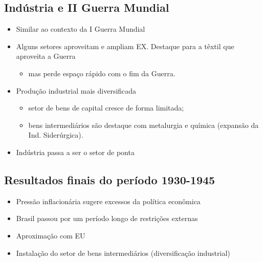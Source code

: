 \documentclass[a4paper,12pt]{article}[abntex2]
\begin{document}
\subsection{Indústria e II Guerra Mundial}
\begin{itemize}
    \item Similar ao contexto da I Guerra Mundial 
    \item Alguns setores aproveitam e ampliam EX. Destaque para a têxtil que aproveita a Guerra
    \begin{itemize}
        \item mas perde espaço rápido com o fim da Guerra. 
    \end{itemize}
    \item Produção industrial mais diversificada
    \begin{itemize}
        \item setor de bens de capital cresce de forma limitada;
        \item bens intermediários são destaque com metalurgia e química (expansão da Ind. Siderúrgica).
    \end{itemize}
    \item  Indústria passa a ser o setor de ponta

 
\end{itemize}

\subsection{Resultados finais do período 1930-1945}
\begin{itemize}
    \item Pressão inflacionária sugere excessos da política econômica
    \item Brasil passou por um período longo de restrições externas
    \item Aproximação com EU
    \item  Instalação do setor de bens intermediários (diversificação industrial)
\end{itemize}
\end{document}
